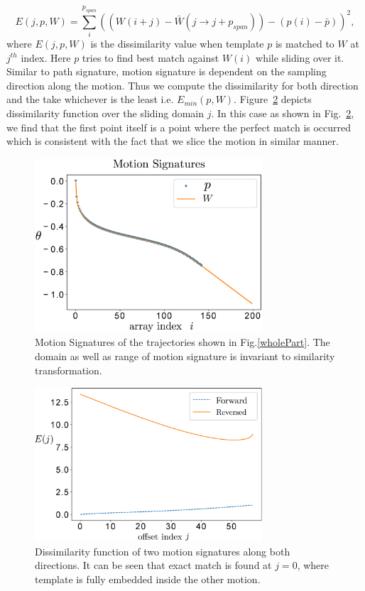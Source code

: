 \documentclass[twocolumn,10pt]{asme2e}
\begin{document}
\begin{equation}\label{mccEq}
  E(j, p, W) = \sum_{i}^{p_{span}} {((W(i+j) - \bar{W}(j\to j + p_{span})) - (p(i) - \bar{p}))}^2,
\end{equation}
where $E(j, p, W)$ is the dissimilarity value when template $p$ is matched to $W$ at $j^{th}$ index. Here $p$ tries to find best match against $W(i)$ while sliding over it.
Similar to path signature, motion signature is dependent on the sampling direction along the motion. Thus we compute the dissimilarity for both direction and the take whichever is the least i.e. $E_{min}(p, W)$.
Figure~\ref{mcc} depicts dissimilarity function over the sliding domain $j$.
In this case as shown in Fig.~\ref{mcc}, we find that the first point itself is a point where the perfect match is occurred which is consistent with the fact that we slice the motion in similar manner.

\begin{figure}
\centering
\includegraphics[width=240pt]{figure/fig_motion_signatures.eps}
  \caption{Motion Signatures of the trajectories shown in Fig.\ref{wholePart}. The domain as well as range of motion signature is invariant to similarity transformation.}
\label{motionSignature}
\end{figure}

\begin{figure}
\centering
\includegraphics[width=240pt]{figure/fig_mcc.eps}
  \caption{Dissimilarity function of two motion signatures along both directions. It can be seen that exact match is found at $j=0$, where template is fully embedded inside the other motion.}
\label{mcc}
\end{figure}
\end{document}
